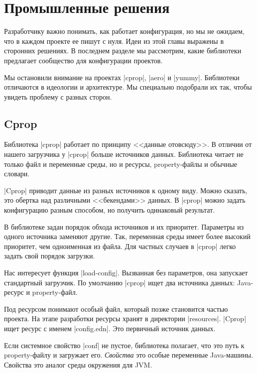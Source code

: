 \section{Промышленные решения}

Разработчику важно понимать, как работает конфигурация, но мы не ожидаем, что в
каждом проекте ее пишут с нуля. Идеи из этой главы выражены в сторонних
решениях. В последнем разделе мы рассмотрим, какие библиотеки предлагает
сообщество для конфигурации проектов.

Мы остановили внимание на проектах \spverb|cprop|, \spverb|aero| и
\spverb|yummy|. Библиотеки отличаются в идеологии и архитектуре. Мы специально
подобрали их так, чтобы увидеть проблему с разных сторон.

\subsection{Cprop}

Библиотека \spverb|cprop| работает по
принципу <<данные отовсюду>>. В отличии от нашего загрузчика у \spverb|cprop|
больше источников данных. Библиотека читает не только файл и переменные среды,
но и ресурсы, property-файлы и обычные словари.

\spverb|Cprop| приводит данные из разных источников к одному виду. Можно
сказать, это обертка над различными <<бекендами>> данных. В \spverb|cprop| можно
задать конфигурацию разным способом, но получить одинаковый результат.

В библиотеке задан порядок обхода источников и их приоритет. Параметры из одного
источника заменяют другие. Так, переменная среды имеет более высокий приоритет,
чем одноименная из файла. Для частных случаев в \spverb|cprop| легко задать свой
порядок загрузки.

Нас интересует функция \spverb|load-config|. Вызванная без параметров, она
запускает стандартный загрузчик. По умолчанию \spverb|cprop| ищет два источника
данных: Java-ресурс и property-файл.

Под ресурсом понимают особый файл, который позже становится частью проекта. На
этапе разработки ресурсы хранят в директории \spverb|resources|. \spverb|Cprop|
ищет ресурс с именем \spverb|config.edn|. Это первичный источник данных.

Если системное свойство \spverb|conf| не пустое, библиотека полагает, что это
путь к property-файлу и загружает его. \emph{Свойства} это особые переменные
Java-машины. Свойства это аналог среды окружения для JVM.

